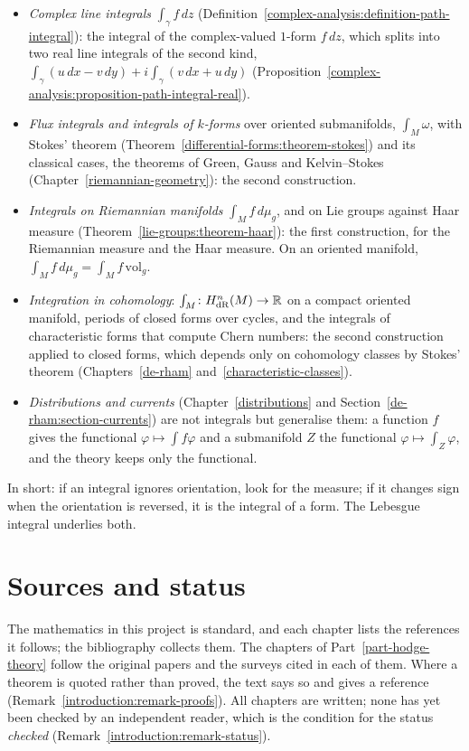 \begin{itemize}
(Proposition~\ref{real-analysis:proposition-second-kind}(3)): choosing the unit tangent $T$ is choosing an orientation.
\item \emph{Complex line integrals} $\int_\gamma f\,dz$ (Definition~\ref{complex-analysis:definition-path-integral}): the integral of the complex-valued $1$-form $f\,dz$, which splits into two real line integrals of the
second kind, $\int_\gamma(u\,dx - v\,dy) + i\int_\gamma(v\,dx + u\,dy)$ (Proposition~\ref{complex-analysis:proposition-path-integral-real}).
\item \emph{Flux integrals and integrals of $k$-forms} over oriented submanifolds, $\int_M\omega$, with Stokes' theorem (Theorem~\ref{differential-forms:theorem-stokes}) and its classical cases, the theorems of Green, Gauss and
Kelvin--Stokes (Chapter~\ref{riemannian-geometry}): the second construction.
\item \emph{Integrals on Riemannian manifolds} $\int_Mf\,d\mu_g$, and on Lie groups against Haar measure (Theorem~\ref{lie-groups:theorem-haar}): the first construction, for the Riemannian measure and the Haar measure. On an
oriented manifold, $\int_Mf\,d\mu_g = \int_Mf\,\mathrm{vol}_g$.
\item \emph{Integration in cohomology}: $\int_M \colon H^n_{\mathrm{dR}}(M) \to \mathbb{R}$ on a compact oriented manifold, periods of closed forms over cycles, and the integrals of characteristic forms that compute Chern
numbers: the second construction applied to closed forms, which depends only on cohomology classes by Stokes' theorem (Chapters~\ref{de-rham} and~\ref{characteristic-classes}).
\item \emph{Distributions and currents} (Chapter~\ref{distributions} and Section~\ref{de-rham:section-currents}) are not integrals but generalise them: a function $f$ gives the functional $\varphi \mapsto \int f\varphi$
and a submanifold $Z$ the functional $\varphi \mapsto \int_Z\varphi$, and the theory keeps only the functional.
\end{itemize}
In short: if an integral ignores orientation, look for the measure; if it changes sign when the orientation is reversed, it is the integral of a form. The Lebesgue integral underlies both.

\section{Sources and status}\label{introduction:section-sources}

The mathematics in this project is standard, and each chapter lists the
references it follows; the bibliography collects them. The chapters of
Part~\ref{part-hodge-theory} follow the original papers and the surveys cited in
each of them. Where a theorem is quoted
rather than proved, the text says so and gives a reference
(Remark~\ref{introduction:remark-proofs}). All chapters are written; none has
yet been checked by an independent reader, which is the condition for the status
\emph{checked} (Remark~\ref{introduction:remark-status}).

